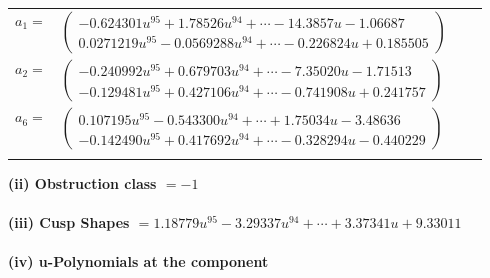\documentclass[1p]{elsarticle_modified}
\theoremstyle{definition}
\begin{document}
\begin{tabular}{m{7pt} m{180pt} m{7pt} m{180pt} }
\flushright $a_{1}=$&$\begin{pmatrix}-0.624301 u^{95}+1.78526 u^{94}+\cdots-14.3857 u-1.06687\\0.0271219 u^{95}-0.0569288 u^{94}+\cdots-0.226824 u+0.185505\end{pmatrix}$ \\
\flushright $a_{2}=$&$\begin{pmatrix}-0.240992 u^{95}+0.679703 u^{94}+\cdots-7.35020 u-1.71513\\-0.129481 u^{95}+0.427106 u^{94}+\cdots-0.741908 u+0.241757\end{pmatrix}$ \\
\flushright $a_{6}=$&$\begin{pmatrix}0.107195 u^{95}-0.543300 u^{94}+\cdots+1.75034 u-3.48636\\-0.142490 u^{95}+0.417692 u^{94}+\cdots-0.328294 u-0.440229\end{pmatrix}$\\&\end{tabular}
\flushleft \textbf{(ii) Obstruction class $= -1$}\\~\\
\flushleft \textbf{(iii) Cusp Shapes $= 1.18779 u^{95}-3.29337 u^{94}+\cdots+3.37341 u+9.33011$}\\~\\
\newpage\renewcommand{\arraystretch}{1}
\flushleft \textbf{(iv) u-Polynomials at the component}\newline \\
\end{document}
